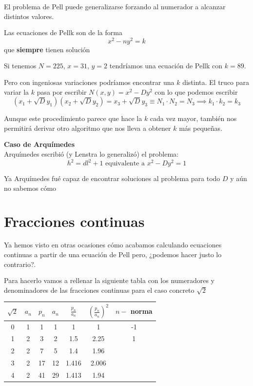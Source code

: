 \documentclass{apuntes}
\begin{document}
El problema de Pell puede generalizarse forzando al numerador a alcanzar distintos valores.

\begin{defn}
Las ecuaciones de Pellk son de la forma
\[x^2-ny^2 = k\]
que \textbf{siempre} tienen solución
\end{defn}

\begin{example}
Si tenemos $N=225$, $x=31$, $y=2$ tendríamos una ecuación de Pellk con $k=89$.

Pero con ingeniosas variaciones podríamos encontrar una $k$ distinta. El truco para variar la $k$ pasa por escribir $N(x,y)=x^2-Dy^2$ con lo que podemos escribir
\[(x_1+\sqrt{D}y_1)(x_2+\sqrt{D}y_2) = x_3 + \sqrt{D}y_3 \equiv N_1\cdot N_2 = N_3 \implies k_1\cdot k_2=k_3\]

Aunque este procedimiento parece que hace la $k$ cada vez mayor, también nos permitirá derivar otro algoritmo que nos lleva a obtener $k$ más pequeñas.
\end{example}

\begin{mdframed}
\textbf{Caso de Arquímedes}\\

Arquímedes escribió (y Lenstra lo generalizó) el problema:
\[h^2=dl^2+1 \text{ equivalente a } x^2-Dy^2 = 1\]

Ya Arquímedes fué capaz de encontrar soluciones al problema para todo $D$ y aún no sabemos cómo
\end{mdframed}

\section{Fracciones continuas}
Ya hemos visto en otras ocasiones cómo acabamos calculando ecuaciones continuas a partir de una ecuación de Pell pero, ¿podemos hacer justo lo contrario?.

Para hacerlo vamos a rellenar la siguiente tabla con los numeradores y denominadores de las fracciones continuas para el caso concreto $\sqrt{2}$

\begin{center}
\begin{tabular}{|c|c|c|c|c|c|c|}
\hline
$\sqrt{2}$ & $a_n$  & $p_n$ & $a_n$ & $\frac{p_n}{a_n}$ & $\left(\frac{p_n}{a_n}\right)^2$ & $n-$ norma \\
\hline
\hline
0 & 1 & 1 & 1 & 1 & 1 & -1 \\
\hline
1 & 2 & 3 & 2 & 1.5 & 2.25  & 1 \\
\hline
2 & 2 & 7 & 5 & 1.4 & 1.96 & \\
\hline
3 & 2 & 17 & 12 & 1.416 & 2.006 & \\
\hline
4 & 2 & 41 & 29 & 1.413 & 1.94 & \\
\hline
\end{tabular}
\end{center}
\end{document}
